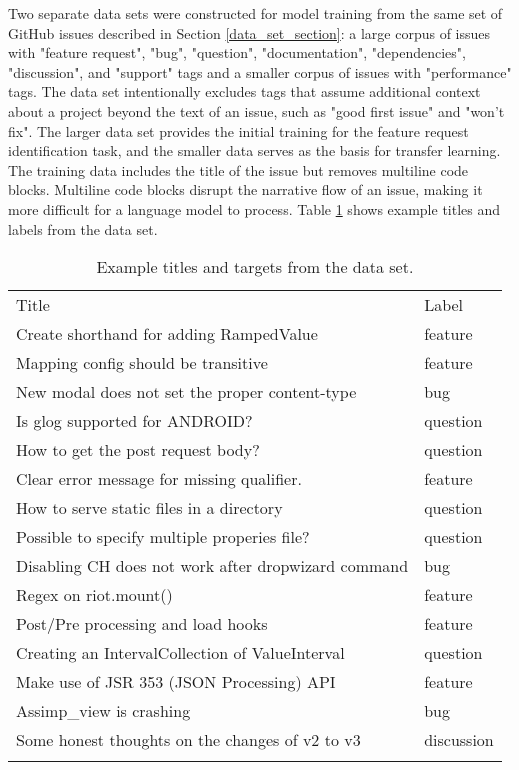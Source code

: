 Two separate data sets were constructed for model training from the same set of GitHub issues described in Section \ref{data_set_section}: a large corpus of issues with "feature request", "bug", "question", "documentation", "dependencies", "discussion", and "support" tags and a smaller corpus of issues with "performance" tags. The data set intentionally excludes tags that assume additional context about a project beyond the text of an issue, such as "good first issue" and "won't fix". The larger data set provides the initial training for the feature request identification task, and the smaller data serves as the basis for transfer learning. The training data includes the title of the issue but removes multiline code blocks. Multiline code blocks disrupt the narrative flow of an issue, making it more difficult for a language model to process. Table \ref{data_examples} shows example titles and labels from the data set.

\begin{table}
\caption{Example titles and targets from the data set.}
\label{data_examples}
\begin{tabular}{ll}
\hline\noalign{\smallskip}
Title & Label \\
\noalign{\smallskip}\hline\noalign{\smallskip}
Create shorthand for adding RampedValue &   feature \\
Mapping config should be transitive  &   feature \\
New modal does not set the proper content-type &       bug \\
Is glog supported for ANDROID?  &  question \\
How to get the post request body?  &  question \\
Clear error message for missing qualifier.  &   feature \\
How to serve static files in a directory  &  question \\
Possible to specify multiple properies file? &  question \\
Disabling CH does not work after dropwizard command &       bug \\
Regex on riot.mount()  &   feature \\
Post/Pre processing and load hooks  &   feature \\
Creating an IntervalCollection of ValueInterval &  question \\
Make use of JSR 353 (JSON Processing) API  &   feature \\
Assimp\_view is crashing   &       bug \\
Some honest thoughts on the changes of v2 to v3 & discussion \\
\noalign{\smallskip}\hline
\end{tabular}
\end{table}

